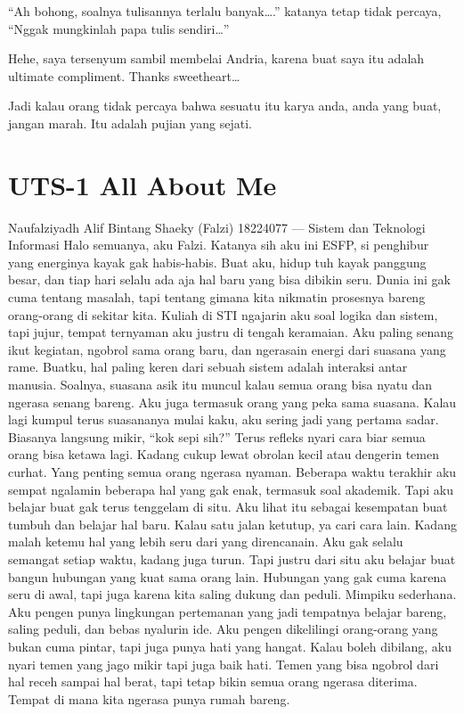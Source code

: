 \documentclass[
  letterpaper,
  DIV=11,
  numbers=noendperiod]{scrreprt}
\begin{document}
``Ah bohong, soalnya tulisannya terlalu banyak\ldots.'' katanya tetap
tidak percaya, ``Nggak mungkinlah papa tulis sendiri\ldots{}''

Hehe, saya tersenyum sambil membelai Andria, karena buat saya itu adalah
ultimate compliment. Thanks sweetheart\ldots{}

Jadi kalau orang tidak percaya bahwa sesuatu itu karya anda, anda yang
buat, jangan marah. Itu adalah pujian yang sejati.


\chapter{UTS-1 All About Me}\label{uts-1-all-about-me}

Naufalziyadh Alif Bintang Shaeky (Falzi) 18224077 --- Sistem dan
Teknologi Informasi Halo semuanya, aku Falzi. Katanya sih aku ini ESFP,
si penghibur yang energinya kayak gak habis-habis. Buat aku, hidup tuh
kayak panggung besar, dan tiap hari selalu ada aja hal baru yang bisa
dibikin seru. Dunia ini gak cuma tentang masalah, tapi tentang gimana
kita nikmatin prosesnya bareng orang-orang di sekitar kita. Kuliah di
STI ngajarin aku soal logika dan sistem, tapi jujur, tempat ternyaman
aku justru di tengah keramaian. Aku paling senang ikut kegiatan, ngobrol
sama orang baru, dan ngerasain energi dari suasana yang rame. Buatku,
hal paling keren dari sebuah sistem adalah interaksi antar manusia.
Soalnya, suasana asik itu muncul kalau semua orang bisa nyatu dan
ngerasa senang bareng. Aku juga termasuk orang yang peka sama suasana.
Kalau lagi kumpul terus suasananya mulai kaku, aku sering jadi yang
pertama sadar. Biasanya langsung mikir, ``kok sepi sih?'' Terus refleks
nyari cara biar semua orang bisa ketawa lagi. Kadang cukup lewat obrolan
kecil atau dengerin temen curhat. Yang penting semua orang ngerasa
nyaman. Beberapa waktu terakhir aku sempat ngalamin beberapa hal yang
gak enak, termasuk soal akademik. Tapi aku belajar buat gak terus
tenggelam di situ. Aku lihat itu sebagai kesempatan buat tumbuh dan
belajar hal baru. Kalau satu jalan ketutup, ya cari cara lain. Kadang
malah ketemu hal yang lebih seru dari yang direncanain. Aku gak selalu
semangat setiap waktu, kadang juga turun. Tapi justru dari situ aku
belajar buat bangun hubungan yang kuat sama orang lain. Hubungan yang
gak cuma karena seru di awal, tapi juga karena kita saling dukung dan
peduli. Mimpiku sederhana. Aku pengen punya lingkungan pertemanan yang
jadi tempatnya belajar bareng, saling peduli, dan bebas nyalurin ide.
Aku pengen dikelilingi orang-orang yang bukan cuma pintar, tapi juga
punya hati yang hangat. Kalau boleh dibilang, aku nyari temen yang jago
mikir tapi juga baik hati. Temen yang bisa ngobrol dari hal receh sampai
hal berat, tapi tetap bikin semua orang ngerasa diterima. Tempat di mana
kita ngerasa punya rumah bareng.
\end{document}
